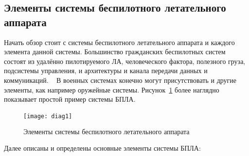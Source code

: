 \documentclass[specification,annotation]{itmo-student-thesis}
\begin{document}
\subsection{Элементы системы беспилотного летательного
аппарата}\label{subsec:uas-elements}

Начать обзор стоит с системы беспилотного летательного аппарата и каждого
элемента данной системы. Большинство гражданских беспилотных систем состоят из
удалённо пилотируемого ЛА, человеческого фактора, полезного груза, подсистемы
управления, и архитектуры и канала передачи данных и коммуникаций.
~\cite{douglas-intro-to-uas} В военных системах конечно могут присутствовать и
другие элементы, как например оружейные системы.  Рисунок~\ref{pic:diag1} более
наглядно показывает простой пример системы БПЛА.

\begin{figure}[!h]
  \caption{Элементы системы беспилотного летательного аппарата}\label{pic:diag1}
  \centering
  \texttt{[image: diag1]}
\end{figure}

Далее описаны и определены основные элементы системы БПЛА:
\end{document}
